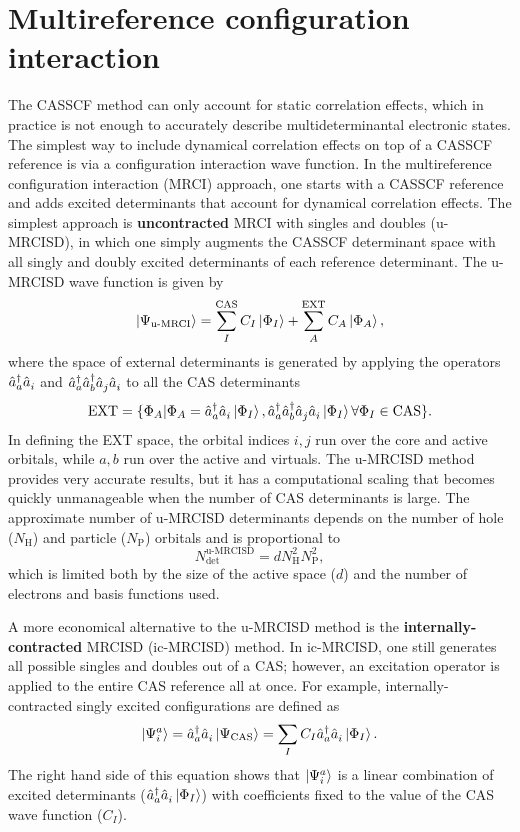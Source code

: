 \documentclass[../Main/chem532-notes.tex]{subfiles}
\begin{document}
\section{Multireference configuration interaction}
The CASSCF method can only account for static correlation effects, which in practice is not enough to accurately describe multideterminantal electronic states.
The simplest way to include dynamical correlation effects on top of a CASSCF reference is via a configuration interaction wave function.
In the multireference configuration interaction (MRCI) approach, one starts with a CASSCF reference and adds excited determinants that account for dynamical correlation effects.
The simplest approach is \textbf{uncontracted} MRCI with singles and doubles (u-MRCISD), in which one simply augments the CASSCF determinant space with all singly and doubly excited determinants of each reference determinant.
The u-MRCISD wave function is given by
\begin{equation}
\ket{\Psi_\text{u-MRCI}}  
= \sum_I^{\mathrm{CAS}} C_I \ket{\Phi_I} + \sum_A^{\mathrm{EXT}} C_A \ket{\Phi_A},
\end{equation}
where the space of external determinants is generated by applying the operators $\hat{a}_{a}^{\dagger} \hat{a}_{i}^{\,}$ and $\hat{a}_{a}^{\dagger} \hat{a}_{b}^{\dagger} \hat{a}_{j}^{\,} \hat{a}_{i}^{\,}$ to all the CAS determinants
\begin{equation}
\mathrm{EXT} = \{ \Phi_A | \Phi_A = \hat{a}_{a}^{\dagger} \hat{a}_{i}^{\,} \ket{\Phi_I}, 
\hat{a}_{a}^{\dagger} \hat{a}_{b}^{\dagger} \hat{a}_{j}^{\,} \hat{a}_{i}^{\,} \ket{\Phi_I} \forall \Phi_I \in \mathrm{CAS}\}.
\end{equation}
In defining the EXT space, the orbital indices $i,j$ run over the core and active orbitals, while $a,b$ run over the active and virtuals.
The u-MRCISD method provides very accurate results, but it has a computational scaling that becomes quickly unmanageable when the number of CAS determinants is large.
The approximate number of u-MRCISD determinants depends on the number of hole ($N_\mathrm{H}$) and particle ($N_\mathrm{P}$) orbitals and is proportional to
\begin{equation}
N_\mathrm{det}^\text{u-MRCISD} = d N_\mathrm{H}^2 N_\mathrm{P}^2,
\end{equation}
which is limited both by the size of the active space ($d$) and the number of electrons and basis functions used.

A more economical alternative to the u-MRCISD method is the \textbf{internally-contracted} MRCISD (ic-MRCISD) method.
In ic-MRCISD, one still generates all possible singles and doubles out of a CAS; however, an excitation operator is applied to the entire CAS reference all at once.
For example, internally-contracted singly excited configurations are defined as
\begin{equation}
\ket{\Psi_{i}^{a}} = \hat{a}_{a}^{\dagger} \hat{a}_{i}^{\,} \ket{\Psi_\mathrm{CAS}} =  \sum_I C_I \hat{a}_{a}^{\dagger} \hat{a}_{i}^{\,}\ket{\Phi_I}.
\end{equation}
The right hand side of this equation shows that $\ket{\Psi_{i}^{a}}$ is a linear combination of excited determinants ($\hat{a}_{a}^{\dagger} \hat{a}_{i}^{\,}\ket{\Phi_I}$) with coefficients fixed to the value of the CAS wave function ($C_I$).
\end{document}
